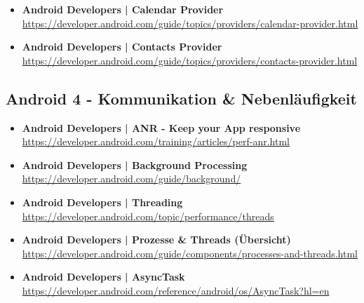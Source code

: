 \documentclass[a4paper]{article}
\begin{document}
{\begin{itemize}
		\item \textbf{Android Developers | Calendar Provider}\\
		\href{https://developer.android.com/guide/topics/providers/calendar-provider.html}
		{https://developer.android.com/guide/topics/providers/calendar-provider.html}
		
		\item \textbf{Android Developers | Contacts Provider}\\
		\href{https://developer.android.com/guide/topics/providers/contacts-provider.html}
		{https://developer.android.com/guide/topics/providers/contacts-provider.html}
		
		
	\end{itemize}
	
	\subsection{Android 4 - Kommunikation \& Nebenläufigkeit}
	
	\begin{itemize}
		
		\item \textbf{Android Developers | ANR - Keep your App responsive}\\
		\href{https://developer.android.com/training/articles/perf-anr.html}
		{https://developer.android.com/training/articles/perf-anr.html}
		
		\item \textbf{Android Developers | Background Processing}\\
		\href{https://developer.android.com/guide/background/}
		{https://developer.android.com/guide/background/}
		
		\item \textbf{Android Developers | Threading}\\
		\href{https://developer.android.com/topic/performance/threads}
		{https://developer.android.com/topic/performance/threads}
		
		\item \textbf{Android Developers | Prozesse \& Threads (Übersicht)}\\
		\href{https://developer.android.com/guide/components/processes-and-threads.html}
		{https://developer.android.com/guide/components/processes-and-threads.html}
		
		\item \textbf{Android Developers | AsyncTask}\\
		\href{https://developer.android.com/reference/android/os/AsyncTask?hl=en}
		{https://developer.android.com/reference/android/os/AsyncTask?hl=en}
		

\end{itemize}}
\end{document}
